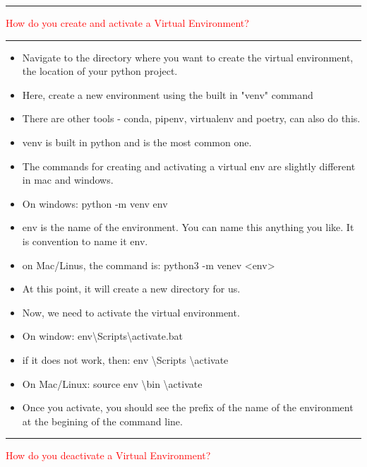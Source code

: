 \documentclass{article}
\begin{document}
\noindent
{\color{red} \rule{\linewidth}{0.5mm}}
\textcolor{red}{How do you create and activate a Virtual Environment?} \\
\noindent
{\color{red} \rule{\linewidth}{0.5mm}}
\begin{itemize}
    \item Navigate to the directory where you want to create the virtual environment, the location of your python project.
    \item Here, create a new environment using the built in "venv" command
    \item There are other tools - conda, pipenv, virtualenv and poetry, can also do this.
    \item venv is built in python and is the most common one.
    \item The commands for creating and activating a virtual env are slightly different in mac and windows.
    \item On windows: python -m venv env
    \item \textlangle env \textrangle is the name of the environment. You can name this anything you like. It is convention to name it env.
    \item on Mac/Linus, the command is: python3 -m venev <env>
    \item At this point, it will create a new directory for us.
    \item Now, we need to activate the virtual environment.
    \item On window: \textlangle env\textrangle \textbackslash Scripts\textbackslash activate.bat
    \item if it does not work, then: \textlangle env \textrangle \textbackslash Scripts \textbackslash activate
    \item On Mac/Linux: source \textlangle env \textrangle \textbackslash bin \textbackslash activate
    \item Once you activate, you should see the prefix of the name of the environment at the begining of the command line.
\end{itemize}
\noindent
{\color{red} \rule{\linewidth}{0.5mm}}
\textcolor{red}{How do you deactivate a Virtual Environment?} \\
\end{document}
